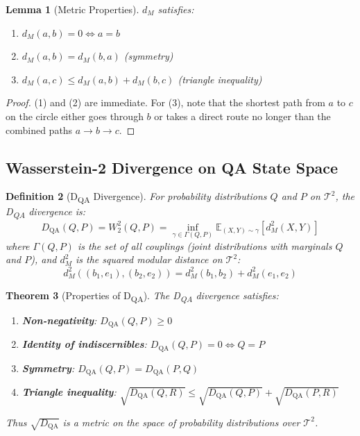 \documentclass[11pt]{article}
\newtheorem{theorem}{Theorem}[section]
\newtheorem{lemma}[theorem]{Lemma}
\newtheorem{definition}[theorem]{Definition}
\theoremstyle{remark}
\begin{document}
\begin{lemma}[Metric Properties]
$d_M$ satisfies:
\begin{enumerate}
    \item $d_M(a, b) = 0 \iff a = b$
    \item $d_M(a, b) = d_M(b, a)$ (symmetry)
    \item $d_M(a, c) \leq d_M(a, b) + d_M(b, c)$ (triangle inequality)
\end{enumerate}
\end{lemma}

\begin{proof}
(1) and (2) are immediate. For (3), note that the shortest path from $a$ to $c$ on the circle either goes through $b$ or takes a direct route no longer than the combined paths $a \to b \to c$.
\end{proof}

\subsection{Wasserstein-2 Divergence on QA State Space}

\begin{definition}[D\textsubscript{QA} Divergence]
\label{def:dqa}
For probability distributions $Q$ and $P$ on $\mathcal{T}^2$, the D\textsubscript{QA} divergence is:
\begin{equation}
D_{\text{QA}}(Q, P) = W_2^2(Q, P) = \inf_{\gamma \in \Gamma(Q, P)} \mathbb{E}_{(X,Y) \sim \gamma} \left[ d_M^2(X, Y) \right]
\end{equation}
where $\Gamma(Q, P)$ is the set of all couplings (joint distributions with marginals $Q$ and $P$), and $d_M^2$ is the squared modular distance on $\mathcal{T}^2$:
\begin{equation}
d_M^2((b_1, e_1), (b_2, e_2)) = d_M^2(b_1, b_2) + d_M^2(e_1, e_2)
\end{equation}
\end{definition}

\begin{theorem}[Properties of D\textsubscript{QA}]
\label{thm:dqa_properties}
The D\textsubscript{QA} divergence satisfies:
\begin{enumerate}
    \item \textbf{Non-negativity}: $D_{\text{QA}}(Q, P) \geq 0$
    \item \textbf{Identity of indiscernibles}: $D_{\text{QA}}(Q, P) = 0 \iff Q = P$
    \item \textbf{Symmetry}: $D_{\text{QA}}(Q, P) = D_{\text{QA}}(P, Q)$
    \item \textbf{Triangle inequality}: $\sqrt{D_{\text{QA}}(Q, R)} \leq \sqrt{D_{\text{QA}}(Q, P)} + \sqrt{D_{\text{QA}}(P, R)}$
\end{enumerate}
Thus $\sqrt{D_{\text{QA}}}$ is a metric on the space of probability distributions over $\mathcal{T}^2$.
\end{theorem}
\end{document}
